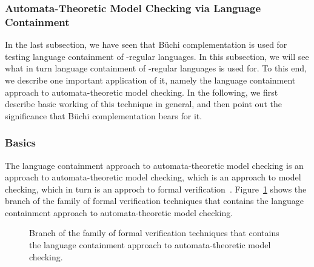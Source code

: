 



\subsubsection{Automata-Theoretic Model Checking via Language Containment}
In the last subsection, we have seen that Büchi complementation is used for testing language containment of \om-regular languages. In this subsection, we will see what in turn language containment of \om-regular languages is used for. To this end, we describe one important application of it, namely the language containment approach to automata-theoretic model checking. In the following, we first describe basic working of this technique in general, and then point out the significance that Büchi complementation bears for it.

\subsubsection{Basics}
The language containment approach to automata-theoretic model checking is an approach to automata-theoretic model checking, which is an approach to model checking, which in turn is an approch to formal verification~\cite{2007_vardi_model_checking}. Figure~\ref{model_checking} shows the branch of the family of formal verification techniques that contains the language containment approach to automata-theoretic model checking.

\begin{figure}[htb]
\centering
\ModelChecking
\caption{Branch of the family of formal verification techniques that contains the language containment approach to automata-theoretic model checking.}
\label{model_checking}
\end{figure}

